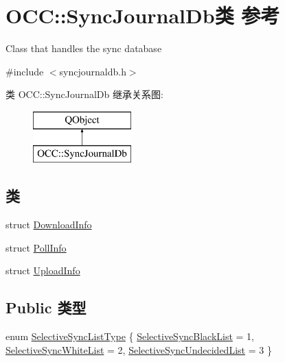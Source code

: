\hypertarget{class_o_c_c_1_1_sync_journal_db}{}\section{O\+CC\+:\+:Sync\+Journal\+Db类 参考}
\label{class_o_c_c_1_1_sync_journal_db}


Class that handles the sync database  




{\ttfamily \#include $<$syncjournaldb.\+h$>$}

类 O\+CC\+:\+:Sync\+Journal\+Db 继承关系图\+:\begin{figure}[H]
\begin{center}
\leavevmode
\includegraphics[height=2.000000cm]{class_o_c_c_1_1_sync_journal_db}
\end{center}
\end{figure}
\subsection*{类}
\begin{DoxyCompactItemize}
\item 
struct \hyperlink{struct_o_c_c_1_1_sync_journal_db_1_1_download_info}{Download\+Info}
\item 
struct \hyperlink{struct_o_c_c_1_1_sync_journal_db_1_1_poll_info}{Poll\+Info}
\item 
struct \hyperlink{struct_o_c_c_1_1_sync_journal_db_1_1_upload_info}{Upload\+Info}
\end{DoxyCompactItemize}
\subsection*{Public 类型}
\begin{DoxyCompactItemize}
\item 
enum \hyperlink{class_o_c_c_1_1_sync_journal_db_ad028daa35155c92ce2e3863602f9feeb}{Selective\+Sync\+List\+Type} \{ \hyperlink{class_o_c_c_1_1_sync_journal_db_ad028daa35155c92ce2e3863602f9feeba98dd47e8a926a0f583bad94b8ed14d8e}{Selective\+Sync\+Black\+List} = 1, 
\hyperlink{class_o_c_c_1_1_sync_journal_db_ad028daa35155c92ce2e3863602f9feeba941c6950705cde6618226bfbfceab05f}{Selective\+Sync\+White\+List} = 2, 
\hyperlink{class_o_c_c_1_1_sync_journal_db_ad028daa35155c92ce2e3863602f9feeba524d06fd4067567f5469b24e5b2dc5ec}{Selective\+Sync\+Undecided\+List} = 3
 \}
\end{DoxyCompactItemize}
